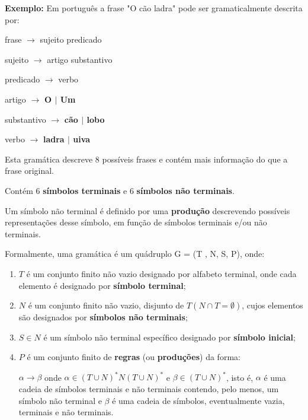\documentclass{article}
\begin{document}
\begin{flushleft}
  \textbf{Exemplo:} Em português a frase "O cão ladra" pode ser gramaticalmente descrita por:
  \begin{center}
    \item frase $\rightarrow$ sujeito predicado
    \item sujeito $\rightarrow$ artigo substantivo
    \item predicado $\rightarrow$ verbo
    \item artigo $\rightarrow$ \textbf{O $|$ Um}
    \item substantivo $\rightarrow$ \textbf{cão $|$ lobo}
    \item verbo $\rightarrow$ \textbf{ladra $|$ uiva}
  \end{center}
  \item Esta gramática descreve 8 possíveis frases e contém mais
  informação do que a frase original.
  \item Contém 6 \textbf{símbolos terminais} e 6 \textbf{símbolos não terminais}.
  \item Um símbolo não terminal é definido por uma \textbf{produção}
  descrevendo possíveis representações desse símbolo, em
  função de símbolos terminais e/ou não terminais.
\end{flushleft}

Formalmente, uma gramática é um quádruplo G = (T , N, S, P), onde:
\begin{enumerate}
  \item $T$ é um conjunto finito não vazio designado por alfabeto
  terminal, onde cada elemento é designado por \textbf{símbolo
  terminal};
  \item $N$ é um conjunto finito não vazio, disjunto de $T (N \cap T = \emptyset)$,
  cujos elementos são designados por \textbf{símbolos não
  terminais};
  \item $S \in N$ é um símbolo não terminal específico designado por
  \textbf{símbolo inicial};
  \item $P$ é um conjunto finito de \textbf{regras} (ou \textbf{produções}) da forma:
  
  $\alpha \rightarrow \beta$ onde $\alpha \in (T \cup N)^* N(T \cup N)^*$ e $\beta \in (T \cup N)^*$,
  isto é, $\alpha$ é uma cadeia de símbolos terminais e não terminais
  contendo, pelo menos, um símbolo não terminal e $\beta$ é uma
  cadeia de símbolos, eventualmente vazia, terminais e não
  terminais.
\end{enumerate}

\pagebreak
\end{document}
